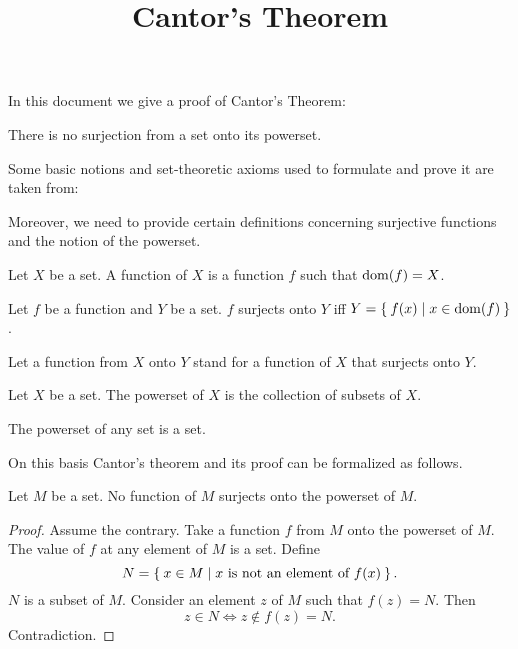 \documentclass{article}
\title{Cantor's Theorem}
\author{}
\date{}
\begin{document}

  \maketitle

  In this document we give a proof of Cantor's Theorem:

  \begin{quotedtheorem}
    There is no surjection from a set onto its powerset.
  \end{quotedtheorem}

  Some basic notions and set-theoretic axioms used to formulate and prove it are
  taken from:

  \begin{forthel}
  \end{forthel}

  Moreover, we need to provide certain definitions concerning surjective
  functions and the notion of the powerset.

  \begin{forthel}
    \begin{definition}
      Let $X$ be a set.
      A function of $X$ is a function $f$ such that $\operatorname{dom}(f) = X$.
    \end{definition}

    \begin{definition}
      Let $f$ be a function and $Y$ be a set.
      $f$ surjects onto $Y$ iff $Y = \Set{f(x) | x \in \operatorname{dom}(f)}$.
    \end{definition}

    Let a function from $X$ onto $Y$ stand for a function of $X$ that surjects onto $Y$.

    \begin{definition}
      Let $X$ be a set.
      The powerset of $X$ is the collection of subsets of $X$.
    \end{definition}

    \begin{axiom}
      The powerset of any set is a set.
    \end{axiom}
  \end{forthel}

  On this basis Cantor's theorem and its proof can be formalized as follows.

  \begin{forthel}
    \begin{theorem}[Cantor]
      Let $M$ be a set.
      No function of $M$ surjects onto the powerset of $M$.
    \end{theorem}
    \begin{proof}
      Assume the contrary.
      Take a function $f$ from $M$ onto the powerset of $M$.
      The value of $f$ at any element of $M$ is a set.
      Define \[ N = \Set{x \in M | \text{$x$ is not an element of $f(x)$}}. \]
      $N$ is a subset of $M$.
      Consider an element $z$ of $M$ such that $f(z) = N$.
      Then \[ z \in N \iff z \notin f(z) = N. \]
      Contradiction.
    \end{proof}
  \end{forthel}
\end{document}
